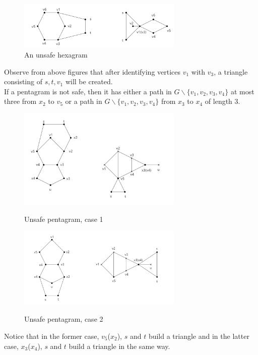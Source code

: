 \begin{figure}[H] %
\centering %
\includegraphics[width=0.7\textwidth]{figure/unsafehexagram.png} 
\caption{An unsafe hexagram} %
\label{figure} %
\end{figure}
Observe from above figures that after identifying vertices $v_1$ with $v_3$, a triangle consisting of $s, t, v_1$ will be created.\newline \\
If a pentagram is not safe, then it has either a path in $G \backslash \{v_1, v_2, v_3, v_4\}$ at most three from $x_2$ to $v_5$ or a path in $G \backslash \{v_1, v_2, v_3, v_4\}$ from $x_3$ to $x_4$ of length 3.
\begin{figure}[H] %
\centering %
\includegraphics[width=0.7\textwidth]{figure/Inkedunsafepentagram1_LI.jpg} 
\label{figure} %
\caption{Unsafe pentagram, case 1}
\end{figure}

\begin{figure}[H] %
\centering %
\includegraphics[width=0.7\textwidth]{figure/unsafepentagram2.png} 
\label{figure} %
\caption{Unsafe pentagram, case 2}
\end{figure}
Notice that in the former case, $v_5$($x_2$), $s$ and $t$ build a triangle and in the latter case, $x_3$($x_4$), $s$ and $t$ build a triangle in the same way.

